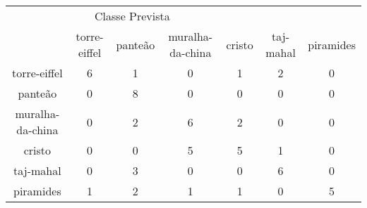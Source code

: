 \begin{tabular}{|c|c|c|c|c|c|c|}
\hline
\multicolumn{5}{|c|}{Classe Prevista}\\
 & torre-eiffel & panteão & muralha-da-china & cristo & taj-mahal & piramides\\
torre-eiffel & 6 & 1 & 0 & 1 & 2 & 0\\
panteão & 0 & 8 & 0 & 0 & 0 & 0\\
muralha-da-china & 0 & 2 & 6 & 2 & 0 & 0\\
cristo & 0 & 0 & 5 & 5 & 1 & 0\\
taj-mahal & 0 & 3 & 0 & 0 & 6 & 0\\
piramides & 1 & 2 & 1 & 1 & 0 & 5\\
\end{tabular}
